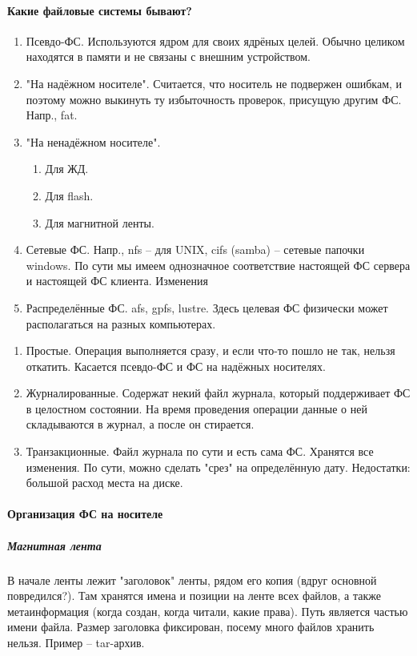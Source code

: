 \documentclass[a4paper,10pt]{article}
\begin{document}
\paragraph{Какие файловые системы бывают?}
\begin{enumerate}
 \item Псевдо-ФС. Используются ядром для своих ядрёных целей. Обычно целиком находятся в памяти и не связаны с внешним устройством.
 \item "На надёжном носителе". Считается, что носитель не подвержен ошибкам, и поэтому можно выкинуть ту избыточность проверок, присущую другим ФС. Напр., fat.
 \item "На ненадёжном носителе". 
 \begin{enumerate}
  \item Для ЖД.
  \item Для flash.
  \item Для магнитной ленты.
 \end{enumerate}
 \item Сетевые ФС. Напр., nfs -- для UNIX, cifs (samba) -- сетевые папочки windows.
 По сути мы имеем однозначное соответствие настоящей ФС сервера и настоящей ФС клиента. Изменения 
 \item Распределённые ФС. afs, gpfs, lustre. 
 Здесь целевая ФС физически может располагаться на разных компьютерах.
\end{enumerate}
\begin{enumerate}
 \item Простые. Операция выполняется сразу, и если что-то пошло не так, нельзя откатить. Касается псевдо-ФС и ФС на надёжных носителях.
 \item Журналированные. Содержат некий файл журнала, который поддерживает ФС в целостном состоянии. На время проведения операции данные о ней складываются в журнал, а после он стирается.
 \item Транзакционные. Файл журнала по сути и есть сама ФС. Хранятся все изменения. По сути, можно сделать "срез" на определённую дату. Недостатки: большой расход места на диске.
\end{enumerate}

\paragraph{Организация ФС на носителе}

\subparagraph{Магнитная лента}
В начале ленты лежит "заголовок" ленты, рядом его копия (вдруг основной повредился?). Там хранятся имена и позиции на ленте всех файлов, а также метаинформация (когда создан, когда читали, какие права). Путь является частью имени файла. Размер заголовка фиксирован, посему много файлов хранить нельзя. Пример -- tar-архив.
\end{document}
